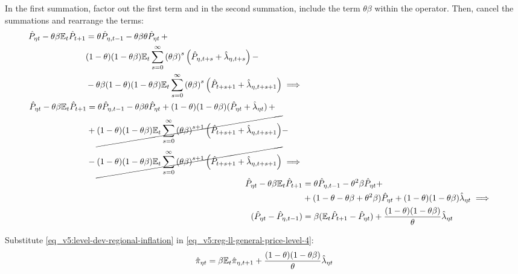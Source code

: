 \documentclass[../thesis.tex]{subfiles}
\begin{document}
In the first summation, factor out the first term and in the second summation, include the term $\theta \beta$ within the operator. Then, cancel the summations and rearrange the terms:
\begin{align}
	\begin{split}
		\hat{P}_{\eta t} - \theta \beta {\mathbb{E}_{t}} \hat{P}_{t+1} &= \theta \hat{P}_{\eta, t-1} - \theta \beta \theta \hat{P}_{\eta t} \, + \\
		& (1-\theta) (1- \theta \beta) {\mathbb{E}_{t}} \sum_{s=0}^{\infty} \left( \theta \beta \right)^s \left( \hat{P}_{\eta, t+s} + \hat{\lambda}_{\eta, t+s} \right) -
		\\
		& - \theta \beta (1-\theta) (1- \theta \beta) {\mathbb{E}_{t}} \sum_{s=0}^{\infty} \left( \theta \beta \right)^s \left( \hat{P}_{t+s+1} + \hat{\lambda}_{\eta, t+s+1} \right) \implies \nonumber 
	\end{split} \\
	\begin{split}
		\hat{P}_{\eta t} - \theta \beta {\mathbb{E}_{t}} \hat{P}_{t+1} &= \theta \hat{P}_{\eta, t-1} - \theta \beta \theta \hat{P}_{\eta t} + (1-\theta) (1- \theta \beta) (\hat{P}_{\eta t} + \hat{\lambda}_{\eta t}) \, + 
		\\
		& + \cancel{(1-\theta) (1- \theta \beta) {\mathbb{E}_{t}} \sum_{s=0}^{\infty} \left( \theta \beta \right)^{s+1} \left( \hat{P}_{t+s+1} + \hat{\lambda}_{\eta, t+s+1} \right)} -
		\\
		& - \cancel{(1-\theta) (1- \theta \beta) {\mathbb{E}_{t}} \sum_{s=0}^{\infty} \left( \theta \beta \right)^{s+1} \left( \hat{P}_{t+s+1} + \hat{\lambda}_{\eta, t+s+1} \right)} \implies \nonumber 
	\end{split} \\
	\hat{P}_{\eta t} - \theta \beta {\mathbb{E}_{t}} \hat{P}_{t+1} &= \theta \hat{P}_{\eta, t-1} - \theta^2 \beta \hat{P}_{\eta t} + \nonumber \\
	& + (1- \theta -\theta \beta + \theta^2 \beta) \hat{P}_{\eta t} + (1-\theta) (1- \theta \beta) \hat{\lambda}_{\eta t} \implies \nonumber \\
	(\hat{P}_{\eta t} - \hat{P}_{\eta, t-1}) &= \beta ({\mathbb{E}_{t}} \hat{P}_{t+1} - \hat{P}_{\eta t}) + \frac{(1-\theta) (1- \theta \beta)}{\theta} \hat{\lambda}_{\eta t}
	\label{eq_v5:reg-ll-general-price-level-4}
\end{align}

Substitute \ref{eq_v5:level-dev-regional-inflation} in \ref{eq_v5:reg-ll-general-price-level-4}:
\begin{align}
	\hat{\pi}_{\eta t} = \beta {\mathbb{E}_{t}} \hat{\pi}_{\eta, t+1} + \frac{(1-\theta) (1- \theta \beta)}{\theta} \hat{\lambda}_{\eta t} \label{eq_v5:reg-nk-phillips-curve-mc}
\end{align}
\end{document}
